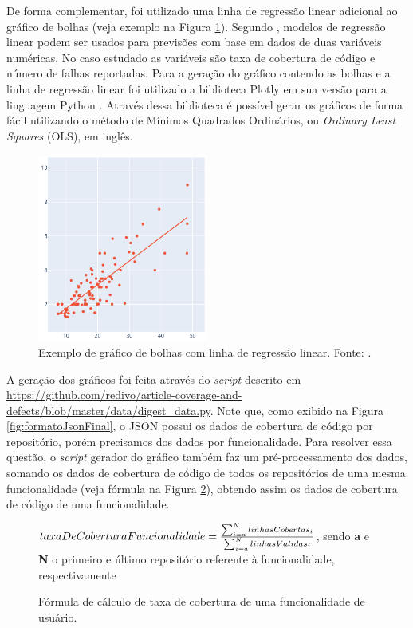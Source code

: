 \documentclass[11.5pt]{article}
\begin{document}
De forma complementar, foi utilizado uma linha de regressão linear adicional ao gráfico de bolhas
(veja exemplo na Figura \ref{fig:lin_reg_example}).
Segundo \cite{openIntroStat}, modelos de regressão linear podem ser usados para previsões com base
em dados de duas variáveis numéricas.
No caso estudado as variáveis são taxa de cobertura de código e número de falhas reportadas.
Para a geração do gráfico contendo as bolhas e a linha de regressão linear foi utilizado a
biblioteca Plotly em sua versão para a linguagem Python \cite{plotly}.
Através dessa biblioteca é possível gerar os gráficos de forma fácil utilizando o método de Mínimos
Quadrados Ordinários, ou \textit{Ordinary Least Squares} (OLS), em inglês.

\begin{figure}[ht]
    \centering
    \includegraphics[width=0.5\textwidth]{linear_regression_example.png}
    \caption{Exemplo de gráfico de bolhas com linha de regressão linear. Fonte: \cite{plotly}.}
    \label{fig:lin_reg_example}
\end{figure}

A geração dos gráficos foi feita através do \textit{script} descrito em
\url{https://github.com/redivo/article-coverage-and-defects/blob/master/data/digest_data.py}.
Note que, como exibido na Figura \ref{fig:formatoJsonFinal}, o JSON possui os dados de cobertura de
código por repositório, porém precisamos dos dados por funcionalidade.
Para resolver essa questão, o \textit{script} gerador do gráfico também faz um pré-processamento
dos dados, somando os dados de cobertura de código de todos os repositórios de uma mesma
funcionalidade (veja fórmula na Figura \ref{fig:formulaTaxaDeCoberturaComponent}), obtendo assim os
dados de cobertura de código de uma funcionalidade.

\begin{figure}[ht]
\caption{Fórmula de cálculo de taxa de cobertura de uma funcionalidade de usuário.}
\label{fig:formulaTaxaDeCoberturaComponent}
\begin{center}
    $taxaDeCoberturaFuncionalidade = {\sum_{i=a}^{N} linhasCobertas_i \over \sum_{i=a}^{N} linhasValidas_i}$, sendo
    \textbf{a} e \textbf{N} o primeiro e último repositório referente à funcionalidade, respectivamente
\end{center}
\end{figure}
\end{document}
